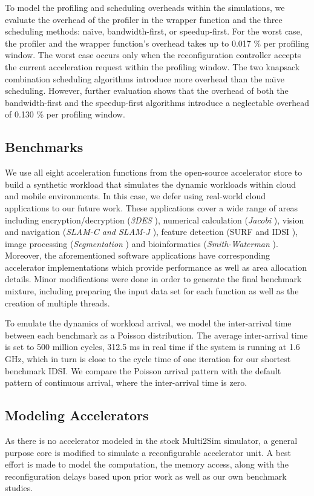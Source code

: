 To model the profiling and scheduling overheads within the simulations,
we evaluate the overhead of the profiler in the wrapper function and the
three scheduling methods: na\"{\i}ve, bandwidth-first, or speedup-first. For
the worst case, the profiler and the wrapper function's overhead takes up
to 0.017 \% per profiling window.  The worst case occurs only
when the reconfiguration controller accepts the current acceleration
request within the profiling window. The two knapsack combination
scheduling algorithms introduce more overhead than the na\"{\i}ve scheduling. However, further evaluation shows that the overhead of both the bandwidth-first and the speedup-first algorithms introduce a neglectable overhead of 0.130 \% per profiling window. 

\subsection{Benchmarks}
We use all eight acceleration functions from the
open-source accelerator store \cite{accstore} to build a synthetic
workload that simulates the dynamic workloads within cloud and mobile
environments.  In this case, we defer using real-world cloud applications to our
future work.  These applications cover a wide range of areas
including encryption/decryption ({\em 3DES} \cite{openssl}), numerical
calculation ({\em Jacobi} \cite{jacobi-wiki}), vision and navigation
({\em SLAM-C and SLAM-J} \cite{openslam}), feature detection (SURF and
IDSI \cite{opencv}), image processing ({\em Segmentation}
\cite{segmentation-wiki}) and bioinformatics ({\em Smith-Waterman}
\cite{smithwaterman-wiki}). Moreover, the aforementioned software applications have
corresponding accelerator implementations which provide
performance as well as area allocation details. Minor modifications were done in order to generate the
final benchmark mixture, including preparing the input data set for
each function as well as the creation of multiple threads.

To emulate the dynamics of workload arrival, we model the inter-arrival time between
each benchmark as a Poisson distribution. The average
inter-arrival time is set to 500 million cycles, 312.5 ms
in real time if the system is running at 1.6 GHz, which in turn is close to the
cycle time of one iteration for our shortest benchmark IDSI. We compare
the Poisson arrival pattern with the default pattern of continuous
arrival, where the inter-arrival time is zero.

\subsection{Modeling Accelerators}
As there is no accelerator modeled in the stock Multi2Sim simulator,
 a general purpose core is modified to simulate a reconfigurable
accelerator unit. A best effort is made to model the
computation, the memory access, along with the reconfiguration delays based
upon prior work as well as our own benchmark studies. 

